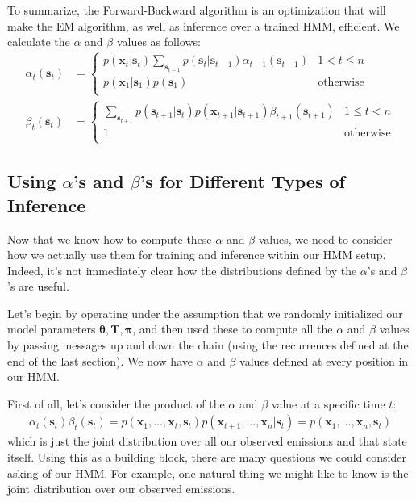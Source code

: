 To summarize, the Forward-Backward algorithm is an optimization that will make the EM algorithm, as well as inference over a trained HMM, efficient. We calculate the $\alpha$ and $\beta$ values as follows:
\begin{align*}
	\alpha_t(\textbf{s}_t) &=
	\begin{cases} 
      p(\textbf{x}_t | \textbf{s}_t) \sum_{\textbf{s}_{t-1}} p(\textbf{s}_t | \textbf{s}_{t-1}) \alpha_{t-1}(\textbf{s}_{t-1}) & 1 < t \leq n \\
      p(\textbf{x}_1 | \textbf{s}_{1}) p(\textbf{s}_1) & \text{otherwise} \\
   \end{cases} \\
   \beta_t(\textbf{s}_t) &=
   \begin{cases} 
      \sum_{\textbf{s}_{t+1}} p(\textbf{s}_{t+1} | \textbf{s}_t) p(\textbf{x}_{t+1} | \textbf{s}_{t+1}) \beta_{t+1}(\textbf{s}_{t+1}) & 1 \leq t < n \\
      1 & \text{otherwise} \\
   \end{cases}
\end{align*}

\subsection{Using $\alpha$'s and $\beta$'s for Different Types of Inference}
Now that we know how to compute these $\alpha$ and $\beta$ values, we need to consider how we actually use them for training and inference within our HMM setup. Indeed, it's not immediately clear how the distributions defined by the $\alpha$'s and $\beta$'s are useful.

Let's begin by operating under the assumption that we randomly initialized our model parameters $\boldsymbol{\theta}, \textbf{T}, \boldsymbol{\pi}$, and then used these to compute all the $\alpha$ and $\beta$ values by passing messages up and down the chain (using the recurrences defined at the end of the last section). We now have $\alpha$ and $\beta$ values defined at every position in our HMM.

First of all, let's consider the product of the $\alpha$ and $\beta$ value at a specific time $t$:
\begin{align*}
	\alpha_t(\textbf{s}_t) \beta_t(\textbf{s}_t) = p(\textbf{x}_1, ..., \textbf{x}_t, \textbf{s}_t) p(\textbf{x}_{t+1}, ..., \textbf{x}_n | \textbf{s}_t) = p(\textbf{x}_1, ..., \textbf{x}_n, \textbf{s}_t)
\end{align*}
which is just the joint distribution over all our observed emissions and that state itself. Using this as a building block, there are many questions we could consider asking of our HMM. For example, one natural thing we might like to know is the joint distribution over our observed emissions.

